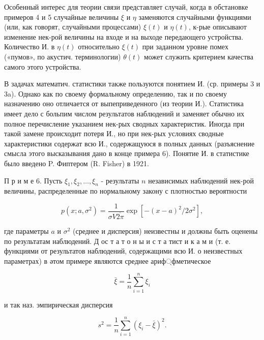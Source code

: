 \documentclass[10pt]{article}
\begin{document}
Особенный интерес для теории связи представляет случай, когда в обстановке примеров 4 и 5 случайные величины $\xi$ и $\eta$ заменяются случайными функциями (или, как говорят, случайными процессами) $\xi(t)$ и $\eta(t)$, к-рые описывают изменение нек-рой величины на входе и на выходе передающего устройства. Количество И. в $\eta(t)$ относительно $\xi(t)$ при заданном уровне помех («пумов», по акустич. терминологии) $\theta(t)$ может служить критерием качества самого этого устройства.



В задачах математич. статистики также пользуются понятием И. (ср. примеры 3 и 3a). Однако как по своему формальному определению, так и по своему назначению оно отличается от выпеприведенного (из теории И.). Статистика имеет дело с больпим числом результатов наблюдений и заменяет обычно их полное перечисление указанием нек-рых сводных характеристик. Иногда при такой замене происходит потеря И., но при нек-рых условиях сводные характеристики содержат всю И., содержащуюся в полных данных (разъяснение смысла этого высказывания дано в конце примера 6). Понятие И. в статистике было введено P. Фиптером (R. Fisher) в 1921.



П р и м е 6. Пусть $\xi_{1}, \xi_{2}, \ldots, \xi_{n}$ - результаты $n$ независимых наблюдений нек-рой величины, распределенные по нормальному закону с плотностью вероятности



\[

p\left(x ; a, \sigma^{2}\right)=\frac{1}{\sigma V \overline{2 \pi}} \exp \left[-(x-a)^{2} / 2 \sigma^{2}\right],

\]



где параметры $a$ и $\sigma^{2}$ (среднее и дисперсия) неизвестны и должны быть оценены по результатам наблюдений. Д ос т а т о н ы и с т а тист и к а м и (т. е. функциями от результатов наблюдений, содержащими всю И. о неизвестных параметрах) в әтом примере являются среднее ариф্фметическое



\[

\bar{\xi}=\frac{1}{n} \sum_{i=1}^{n} \xi_{i}

\]



и так наз. эмпирическая дисперсия



\[

s^{2}=\frac{1}{n} \sum_{i=1}^{n}\left(\xi_{i}-\bar{\xi}\right)^{2} .

\]
\end{document}
